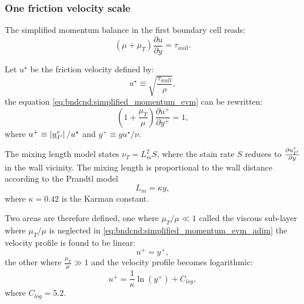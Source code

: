 \subsubsection{One friction velocity scale}\label{sec:bndcnd:1velocityscales}

The simplified momentum balance in the first boundary cell reads:
\begin{equation}\label{eq:bndcnd:simplified_momentum_evm}
\left( \mu + \mu_T \right) \dfrac{\partial u}{\partial y} = \tau_{wall}.
\end{equation}

Let $u^\star$ be the friction velocity defined by:
\begin{equation}\label{eq:bndcnd:ustar_1scale_def}
u^\star \equiv \sqrt{ \dfrac{\tau_{wall}}{\rho}},
\end{equation}
%
the equation \eqref{eq:bndcnd:simplified_momentum_evm} can be rewritten:
%
\begin{equation}\label{eq:bndcnd:simplified_momentum_evm_adim}
\left( 1 + \dfrac{\mu_T}{ \mu} \right) \dfrac{\partial u^+}{\partial y^+} = 1,
\end{equation}
where $u^+ \equiv \left|  \underline{u}^r_{{I^\prime}}  \right| / u^\star$ and $ y^+ \equiv y u^\star / \nu$.

The mixing length model states $\nu_T = L_m^2 S $, where the stain rate $S$ reduces to $ \frac{\partial u^r_{{I^\prime}} }{\partial y} $ in the wall vicinity.
The mixing length is proportional to the wall distance according to the Prandtl model
\begin{equation}\label{eq:bndcnd:prandtl_model}
L_m = \kappa y,
\end{equation}
where $\kappa = 0.42$ is the Karman constant.

Two areas are therefore defined, one where $ \mu_T/\mu  \ll 1$ called the viscous sub-layer where $\mu_T/\mu $ is neglected in \eqref{eq:bndcnd:simplified_momentum_evm_adim} the velocity profile is found to be linear:
%
\begin{equation}\label{eq:bndcnd:linear_profile}
u^+ = y^+,
\end{equation}
%
the other where $ \frac{\mu_T}{\mu}  \gg 1$ and the velocity profile becomes logarithmic:
\begin{equation}\label{eq:bndcnd:log_profile}
u^+ = \dfrac{1}{\kappa} \ln \left( y^+\right) + C_{log},
\end{equation}
where $C_{log}=5.2$.

